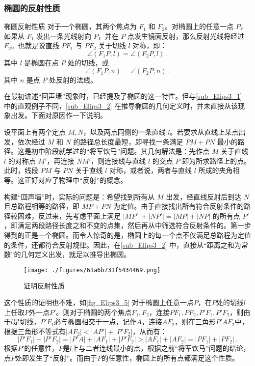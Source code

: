 \subsubsection{椭圆的反射性质}

\begin{theorem}{椭圆反射性质}
对于一个椭圆，其两个焦点为 $F_1$ 和 $F_2$。对椭圆上的任意一点 $P$，如果从 $F_1$ 发出一条光线射向 $P$，并在 $P$ 点发生镜面反射，那么反射光线将经过 $F_2$。也就是说直线 $PF_1$ 与 $PF_2$ 关于切线 $l$ 对称，即：
\begin{equation}
\angle (F_1P, l) = \angle (F_2P, l)~.
\end{equation}
其中 $l$ 是椭圆在点 $P$ 处的切线，或
\begin{equation}
\angle (F_1P, n) = \angle (F_2P, n)~.
\end{equation}
其中 $n$ 是点 $P$ 处反射的法线。
\end{theorem}

在最初讲述“回声墙”现象时，已经提及了椭圆的这一特性。但与\autoref{sub_Elips3_1} 中的直观例子不同，\autoref{sub_Elips3_2} 在推导椭圆的几何定义时，并未直接从该现象出发。下面对原因作一下说明。

设平面上有两个定点 $M,N$，以及两点同侧的一条直线 $l$。若要求从直线上某点出发，依次经过 $M$ 和 $N$ 的路径总长度最短，即寻找一条满足 $PM + PN$ 最小的路径。这是初中阶段就学过的“将军饮马”问题。其几何解法是：先作点 $M$ 关于直线 $l$ 的对称点 $M'$，再连接 $NM'$，则连接线与直线 $l$ 的交点 $P$ 即为所求路径上的点。此时，线段 $PM$ 与 $PN$ 关于直线 $l$ 对称，或者说，两者与直线 $l$ 所成的夹角相等。这正好对应了物理中“反射”的概念。

构建“回声墙”时，实际的问题是：希望找到所有从 $M$ 出发，经直线反射后到达 $N$ 且总路程相等的路径，即 $MP + PN$ 为定值。由于直接找出所有符合反射条件的路径较困难，反过来，先考虑平面上满足 $|MP'| + |NP'| = |MP| + |NP|$ 的所有点 $P'$，即满足两段路径长度之和不变的点集，然后再从中筛选符合反射条件的。第一步得到的正是一个椭圆。而令人惊奇的是，椭圆上的每一个点不仅满足总路程为定值的条件，还都符合反射规律。因此，在\autoref{sub_Elips3_2} 中，直接从“距离之和为常数”的几何定义出发，就足以推导出椭圆。

\begin{figure}[ht]
\centering
\texttt{[image: ./figures/61a6b731f5434469.png]}
\caption{证明反射性质} \label{fig_Elips3_5}
\end{figure}

这个性质的证明也不难，如\autoref{fig_Elips3_5} 对于椭圆上任意一点$P$，在$P$处的切线$l$上任取$P$外一点$P'$。则对于椭圆的两个焦点$F_1,F_2$，连接$PF_1,PF_2,P'F_1,P'F_2$，则由于$l$是切线，$P'F_1$必与椭圆相交于一点，记作$A$，连接$AF_2$，则在三角形$P'AF_2$中，根据三角形不等式有$|AF_2|<|AP'|+|P'F_2|$，从而有：
\begin{equation}
|P'F_1|+|P'F_2|=|P'A|+|AF_1|+|P'F_2|>|AF_1|+|AF_2|=|PF_1|+|PF_2|~.
\end{equation}
根据$P'$的任意性，$P$是$l$上与二者连线最小的点，根据之前“将军饮马”问题的结论，点$P$处即发生了“反射”。而由于$P$的任意性，椭圆上的所有点都满足这个性质。

